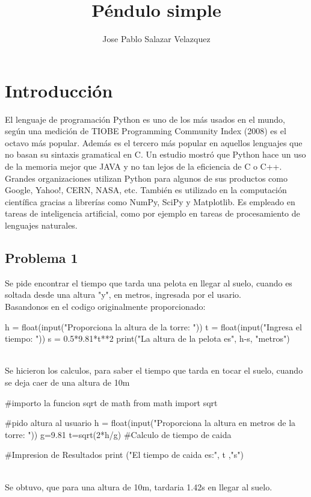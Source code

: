 \documentclass[12pt]{article}
\title{Péndulo simple}
\author{Jose Pablo Salazar Velazquez}
\date{}
\begin{document}
\maketitle

\section{Introducción}
El lenguaje de programación Python es uno de los más usados en el mundo, según una medición de TIOBE Programming Community Index (2008) es el octavo más popular. Además es el tercero más popular en aquellos lenguajes que no basan su sintaxis gramatical en C. Un estudio mostró que Python hace un uso de la memoria mejor que JAVA y no tan lejos de la eficiencia de C o C++. Grandes organizaciones utilizan Python para algunos de sus productos como Google, Yahoo!, CERN, NASA, etc. También es utilizado en la computación científica gracias a librerías como NumPy, SciPy y Matplotlib. Es empleado en tareas de inteligencia artificial, como por ejemplo en tareas de procesamiento de lenguajes naturales.
\pagebreak
\subsection{Problema 1}
Se pide encontrar el tiempo que tarda una pelota en llegar al suelo, cuando es soltada desde una altura "y", en metros, ingresada por el usario. \\
Basandonos en el codigo originalmente proporcionado: \\
\begin{boxedverbatim}
h = float(input("Proporciona la altura de la torre: "))
t = float(input("Ingresa el tiempo: "))
s = 0.5*9.81*t**2
print("La altura de la pelota es", h-s, "metros")
\end{boxedverbatim} 
\\
Se hicieron los calculos, para saber el tiempo que tarda en tocar el suelo, cuando se deja caer de una altura de 10m \\
\begin{boxedverbatim}
#importo la funcion sqrt de math
from math import sqrt

#pido altura al usuario
h = float(input("Proporciona la altura en metros de la torre: "))
g=9.81
t=sqrt(2*h/g) #Calculo de tiempo de caida

#Impresion de Resultados
print ("El tiempo de caida es:", t ,"s")
\end{boxedverbatim}
\\
Se obtuvo, que para una altura de 10m, tardaria 1.42s en llegar al suelo.
\pagebreak
\end{document}
